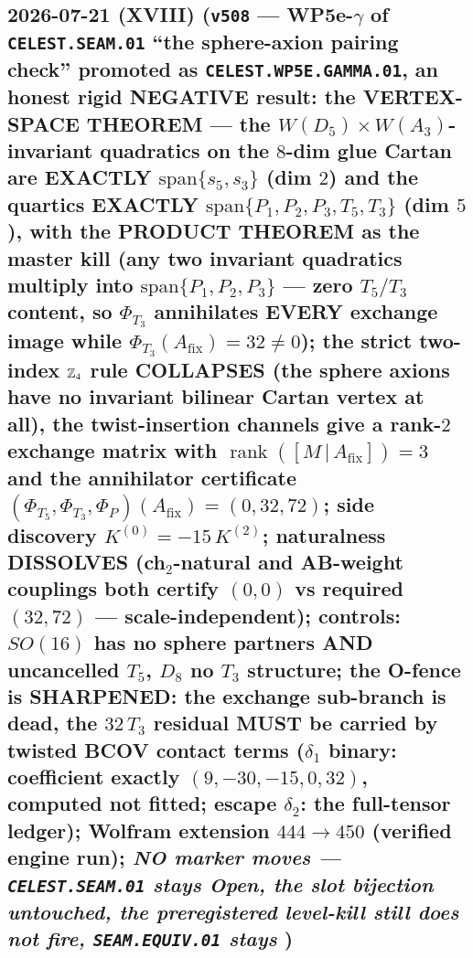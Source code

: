 \subsection*{2026-07-21 (XVIII) (\texttt{v508} --- WP5e-$\gamma$ of \texttt{CELEST.SEAM.01} ``the sphere-axion pairing check'' promoted as \texttt{CELEST.WP5E.GAMMA.01}, an honest rigid NEGATIVE result: the VERTEX-SPACE THEOREM --- the $W(D_5){\times}W(A_3)$-invariant quadratics on the $8$-dim glue Cartan are EXACTLY $\mathrm{span}\{s_5,s_3\}$ (dim $2$) and the quartics EXACTLY $\mathrm{span}\{P_1,P_2,P_3,T_5,T_3\}$ (dim $5$), with the PRODUCT THEOREM as the master kill (any two invariant quadratics multiply into $\mathrm{span}\{P_1,P_2,P_3\}$ --- zero $T_5/T_3$ content, so $\Phi_{T_3}$ annihilates EVERY exchange image while $\Phi_{T_3}(A_{\mathrm{fix}})=32\neq0$); the strict two-index $\mathbb{Z}_4$ rule COLLAPSES (the sphere axions have no invariant bilinear Cartan vertex at all), the twist-insertion channels give a rank-$2$ exchange matrix with $\operatorname{rank}([M\,|\,A_{\mathrm{fix}}])=3$ and the annihilator certificate $(\Phi_{T_5},\Phi_{T_3},\Phi_P)(A_{\mathrm{fix}})=(0,32,72)$; side discovery $K^{(0)}=-15\,K^{(2)}$; naturalness DISSOLVES (ch$_2$-natural and AB-weight couplings both certify $(0,0)$ vs required $(32,72)$ --- scale-independent); controls: $SO(16)$ has no sphere partners AND uncancelled $T_5$, $D_8$ no $T_3$ structure; the O-fence is SHARPENED: the exchange sub-branch is dead, the $32\,T_3$ residual MUST be carried by twisted BCOV contact terms ($\delta_1$ binary: coefficient exactly $(9,-30,-15,0,32)$, computed not fitted; escape $\delta_2$: the full-tensor ledger); Wolfram extension $444\to450$ (verified engine run); \emph{NO marker moves --- \texttt{CELEST.SEAM.01} stays Open, the slot bijection untouched, the preregistered level-kill still does not fire, \texttt{SEAM.EQUIV.01} stays \mO})}
